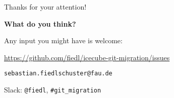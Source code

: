 
\begin{frame}{Thanks for your attention!}
  \begin{center}
    \Huge \textbf{What do you think?}
    \vspace{2em}

    \normalsize
    Any input you might have is welcome: \\ \vspace{0.3cm}

    \url{https://github.com/fiedl/icecube-git-migration/issues} \\ \vspace{0.2cm}

    \texttt{sebastian.fiedlschuster@fau.de}

    Slack: \texttt{@fiedl}, \texttt{\#git\_migration}

    \vspace{1.5cm}

  \end{center}
\end{frame}
